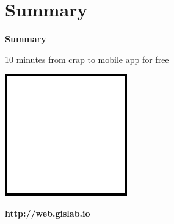 \documentclass[12pt]{beamer}
\begin{document}
\section{Summary}
\begin{frame}
	\begin{center}
		\LARGE\textbf{Summary}
	\end{center}
\end{frame}

\begin{frame}{10 minutes from crap to mobile app for free}
	\begin{center}
		\includegraphics[keepaspectratio=true,height=0.5\textheight]{images/image.png}
	\end{center}
\end{frame}

\begin{frame}
	\begin{center}
		\textbf{http://web.gislab.io}
	\end{center}
\end{frame}


\end{document}
